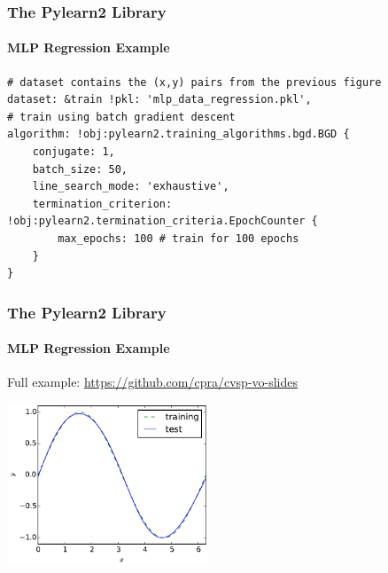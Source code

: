 \documentclass[xetex,professionalfont]{beamer}
\begin{document}
\begin{frame}[fragile]
\frametitle{The Pylearn2 Library}
\framesubtitle{MLP Regression Example}

\begin{verbatim}
# dataset contains the (x,y) pairs from the previous figure
dataset: &train !pkl: 'mlp_data_regression.pkl',
# train using batch gradient descent
algorithm: !obj:pylearn2.training_algorithms.bgd.BGD {
    conjugate: 1,
    batch_size: 50,
    line_search_mode: 'exhaustive',
    termination_criterion: !obj:pylearn2.termination_criteria.EpochCounter {
        max_epochs: 100 # train for 100 epochs
    }
}
\end{verbatim}

\end{frame}


\begin{frame}
\frametitle{The Pylearn2 Library}
\framesubtitle{MLP Regression Example}

Full example: \url{https://github.com/cpra/cvsp-vo-slides}

\medskip
\begin{center}
	\includegraphics[width=6cm]{figures/mlp-regression.pdf} %
\end{center}

\end{frame}

\end{document}
